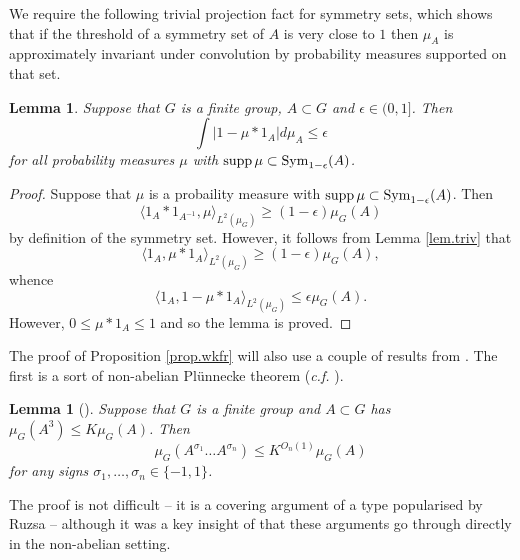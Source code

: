 \documentclass[12pt]{amsart}
\numberwithin{equation}{section}
\theoremstyle{plain}
\newtheorem{lemma}[subsection]{Lemma}
\theoremstyle{definition}
\renewcommand{\leq}{\leqslant}
\renewcommand{\geq}{\geqslant}
\providecommand{\supp}{\mathop{\rm supp}\nolimits}
\providecommand{\Sym}{\mathop{\rm Sym}\nolimits}
\begin{document}
We require the following trivial projection fact for symmetry sets, which shows that if the threshold of a symmetry set of $A$ is very close to $1$ then $\mu_A$ is approximately invariant under convolution by probability measures supported on that set.
\begin{lemma}\label{lem.approxproj}
Suppose that $G$ is a finite group, $A \subset G$ and $\epsilon \in (0,1]$. Then
\begin{equation*}
\int{|1-\mu \ast 1_A|d\mu_A} \leq \epsilon
\end{equation*}
for all probability measures $\mu$ with $\supp \mu \subset \Sym_{1-\epsilon}(A)$.
\end{lemma}
\begin{proof}
Suppose that $\mu$ is a probaility measure with $\supp \mu \subset \Sym_{1-\epsilon}(A)$. Then
\begin{equation*}
\langle 1_A \ast 1_{A^{-1}},\mu\rangle_{L^2(\mu_G)} \geq (1-\epsilon) \mu_G(A)
\end{equation*}
by definition of the symmetry set.  However, it follows from Lemma \ref{lem.triv} that
\begin{equation*}
\langle 1_A , \mu \ast 1_{A} \rangle_{L^2(\mu_G)}\geq (1-\epsilon)\mu_G(A),
\end{equation*}
whence
\begin{equation*}
\langle 1_A,1-\mu \ast 1_A\rangle_{L^2(\mu_G)} \leq \epsilon \mu_G(A).
\end{equation*}
However, $0 \leq \mu\ast 1_A \leq 1$ and so the lemma is proved.
\end{proof}
The proof of Proposition \ref{prop.wkfr} will also use a couple of results from \cite{TCTNC}.  The first is a sort of non-abelian Pl{\"u}nnecke theorem (\emph{c.f.} \cite{HP}). 
\begin{lemma}[{\cite[Lemma 3.4]{TCTNC}}] \label{lem.cover} Suppose that $G$ is a finite group and $A \subset G$ has $\mu_G(A^3) \leq K\mu_G(A)$. Then
\begin{equation*}
\mu_G(A^{\sigma_1}\dots A^{\sigma_n})\leq K^{O_n(1)}\mu_G(A)
\end{equation*}
for any signs $\sigma_1,\dots,\sigma_n \in \{-1,1\}$.
\end{lemma}
The proof is not difficult -- it is a covering argument of a type popularised by Ruzsa \cite{IZRArb} -- although it was a key insight of \cite{TCTNC} that these arguments go through directly in the non-abelian setting.
\end{document}

